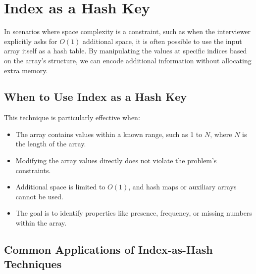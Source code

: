 \section{Index as a Hash Key}
\label{sec:IndexAsHashKey}

In scenarios where space complexity is a constraint, such as when the interviewer explicitly asks for \( O(1) \) additional space, it is often possible to use the input array itself as a hash table. By manipulating the values at specific indices based on the array's structure, we can encode additional information without allocating extra memory.

\subsection*{When to Use Index as a Hash Key}
This technique is particularly effective when:
\begin{itemize}
    \item The array contains values within a known range, such as 1 to \( N \), where \( N \) is the length of the array.
    \item Modifying the array values directly does not violate the problem's constraints.
    \item Additional space is limited to \( O(1) \), and hash maps or auxiliary arrays cannot be used.
    \item The goal is to identify properties like presence, frequency, or missing numbers within the array.
\end{itemize}

\subsection*{Common Applications of Index-as-Hash Techniques}

